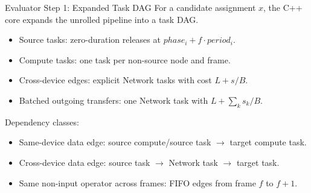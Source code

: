 \documentclass[aspectratio=169]{beamer}
\begin{document}
\begin{frame}{Evaluator Step 1: Expanded Task DAG}
  For a candidate assignment $x$, the C++ core expands the unrolled pipeline into a task DAG.
  \begin{itemize}
    \item Source tasks: zero-duration releases at $phase_i+f\cdot period_i$.
    \item Compute tasks: one task per non-source node and frame.
    \item Cross-device edges: explicit Network tasks with cost $L+s/B$.
    \item Batched outgoing transfers: one Network task with $L+\sum_k s_k/B$.
  \end{itemize}
  Dependency classes:
  \begin{itemize}
    \item Same-device data edge: source compute/source task $\rightarrow$ target compute task.
    \item Cross-device data edge: source task $\rightarrow$ Network task $\rightarrow$ target task.
    \item Same non-input operator across frames: FIFO edges from frame $f$ to $f+1$.
  \end{itemize}
\end{frame}
\end{document}
